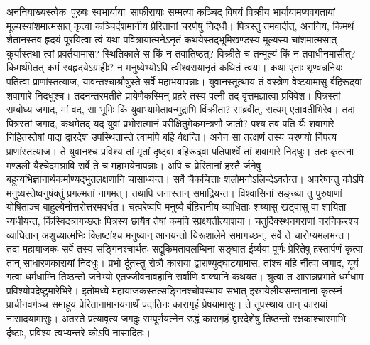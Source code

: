 \adhyAya
{}
\vakya अननियाख्यस्त्वेकः पुरुषः स्वभार्यायाः साफीरायाः सम्मत्या कञ्चिद् विषयं विक्रीय
\vakya भार्यायामप्यवगतायां मूल्यस्यांशमात्मसात् कृत्वा कञ्चिदंशमानीय प्रेरितानां चरणेषु निदधौ।
\vakya पित्रस्तु तमवादीत्, अननिय, किमर्थं शैतानस्तव हृदयं पूरयित्वा त्वं यथा पवित्रायात्मनेऽनृतं कथयेस्तद्भूमिखण्डस्य मूल्यस्य चांशमात्मसात् कुर्यास्तथा त्वां प्रवर्तयामास?
\vakya स्थितिकाले स किं न तवातिष्ठत्? विक्रीते च तन्मूल्यं किं न तवाधीनमासीत्? किमर्थमेतत् कर्म स्वहृदयेऽग्राहीः? न मनुष्येभ्योऽपि त्वीश्वरायानृतं कथितं त्वया।
\vakya कथा एताः शृण्वन्ननियः पतित्वा प्राणांस्तत्याज, यावन्तश्चाश्रौषुस्ते सर्वे महाभयापन्नाः।
\vakya युवानस्तूत्थाय तं वस्त्रेण वेष्टयामासु र्बहिरूढ्वा शवागारे निदधुश्च।
\vakya तदनन्तरमतीते प्रायेणैकस्मिन् प्रहरे तस्य पत्नी तद् वृत्तमज्ञात्वा प्रविवेश।
\vakya पित्रस्तां सम्बोध्य जगाद, मां वद, सा भूमिः किं युवाभ्यामेतावन्मुद्राभि र्विक्रीता? साब्रवीत्, सत्यम् एतावतीभिरेव।
\vakya तदा पित्रस्तां जगाद, कथमेतद् यद् युवां प्रभोरात्मानं परीक्षितुमेकमन्त्रणौ जातौ? पश्य तव पति र्यैः शवागारे निहितस्तेषां पादा द्वारदेश उपस्थितास्ते त्वामपि बहि र्वक्षन्ति।
\vakya अनेन सा तत्क्षणं तस्य चरणयो र्निपत्य प्राणांस्तत्याज। ते युवानश्च प्रविश्य तां मृतां दृष्ट्वा बहिरूढ्वा पतिपार्श्वे तां शवागारे निदधुः।
\vakya ततः कृत्स्ना मण्डली यैश्चेदमश्रावि सर्वे ते च महाभयेनापन्नाः।
\vakya अपि च प्रेरितानां हस्तै र्जनेषु बहून्यभिज्ञानार्थकर्माण्यद्भुतलक्षणानि चासाध्यन्त।
\vakya सर्वे चैकचित्ताः शलोमनोऽलिन्देऽवर्तन्त। अपरेषान्तु कोऽपि मनुष्यस्तेष्वनुषंक्तुं प्रगल्भतां नागमत्। तथापि जनास्तान् समाद्रियन्त।
\vakya विश्वासिनां सङ्ख्या तु पुरुषाणां योषिताञ्च बाहुल्येनोत्तरोत्तरमवर्धत।
\vakya चत्वरेष्वपि मनुष्यै र्बहिरानीय व्याधिताः शय्यासु खट्वासु वा शायिता न्यधीयन्त, किंस्विदत्रागच्छतः पित्रस्य छायैव तेषां कमपि स्प्रक्ष्यतीत्याशया।
\vakya चतुर्दिक्स्थनगराणां नरनिकरश्च व्याधितान् अशुच्यात्मभिः क्लिष्टांश्च मनुष्यान् आनयन्तो यिरूशालेमे समागच्छन्, सर्वे ते चारोग्यमलभन्त।
\vakya तदा महायाजकः सर्वे तस्य सङ्गिनश्चार्थतः सद्दूकिमतावलम्बिनां सङ्घात ईर्ष्यया पूर्णः
\vakya प्रेरितेषु हस्तार्पणं कृत्वा तान् साधारणकारायां निदधुः।
\vakya प्रभो र्दूतस्तु रोत्रौ काराया द्वाराण्युद्घाटयामास, तांश्च बहि र्नीत्वा जगाद,
\vakya यूयं गत्वा धर्मधाम्नि तिष्ठन्तो जनेभ्यो एतज्जीवनावहानि सर्वाणि वाक्यानि कथयत।
\vakya श्रुत्वा त आसन्नप्रभाते धर्मधाम प्रविश्योपदेष्टुमारेभिरे। इतोमध्ये महायाजकस्तत्सङ्गिनश्चोपस्थाय सभात् इस्रायेलीयसन्तानानां कृत्स्नं प्राचीनवर्गञ्च समाहूय प्रेरितानामानयनार्थं पदातिनः कारागृहं प्रेषयामासुः।
\vakya ते तूपस्थाय तान् कारायां नासादयामासुः।
\vakya अतस्ते प्रत्यावृत्य जगदुः सम्पूर्णयत्नेन रुद्धं कारागृहं द्वारदेशेषु तिष्ठन्तो रक्षकाश्चास्माभि र्दृष्टाः, प्रविश्य त्वभ्यन्तरे कोऽपि नासादितः।
